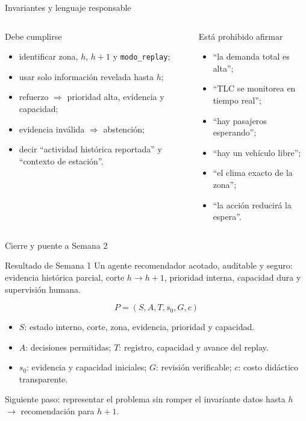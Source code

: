 \documentclass[aspectratio=169,11pt]{beamer}
\begin{document}
\begin{frame}{Invariantes y lenguaje responsable}
  \scriptsize
  \begin{columns}[T]
      \begin{block}{Debe cumplirse}
        \begin{itemize}
          \item identificar zona, $h$, $h+1$ y \texttt{modo\_replay};
          \item usar solo información revelada hasta $h$;
          \item refuerzo $\Rightarrow$ prioridad alta, evidencia y capacidad;
          \item evidencia inválida $\Rightarrow$ abstención;
          \item decir ``actividad histórica reportada'' y ``contexto de estación''.
        \end{itemize}
      \end{block}
      \begin{alertblock}{Está prohibido afirmar}
        \begin{itemize}
          \item ``la demanda total es alta'';
          \item ``TLC se monitorea en tiempo real'';
          \item ``hay pasajeros esperando'';
          \item ``hay un vehículo libre'';
          \item ``el clima exacto de la zona'';
          \item ``la acción reducirá la espera''.
        \end{itemize}
      \end{alertblock}
  \end{columns}
\end{frame}

\begin{frame}{Cierre y puente a Semana 2}
  \begin{block}{Resultado de Semana 1}
    Un agente recomendador acotado, auditable y seguro: evidencia histórica parcial, corte $h\rightarrow h+1$, prioridad interna, capacidad dura y supervisión humana.
  \end{block}
  \[
    \boxed{P=(S,A,T,s_0,G,c)}
  \]
  \begin{itemize}
    \item $S$: estado interno, corte, zona, evidencia, prioridad y capacidad.
    \item $A$: decisiones permitidas; $T$: registro, capacidad y avance del replay.
    \item $s_0$: evidencia y capacidad iniciales; $G$: revisión verificable; $c$: costo didáctico transparente.
  \end{itemize}
  \alert{Siguiente paso: representar el problema sin romper el invariante datos hasta $h$ $\rightarrow$ recomendación para $h+1$.}
\end{frame}
\end{document}
